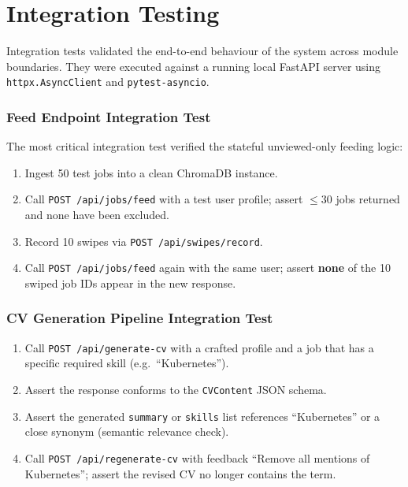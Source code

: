 \documentclass[12pt, a4paper, oneside]{report}
\begin{document}
\section{Integration Testing}
\label{sec:integration-testing}

Integration tests validated the end-to-end behaviour of the system across module
boundaries. They were executed against a running local FastAPI server using
\texttt{httpx.AsyncClient} and \texttt{pytest-asyncio}.

\subsubsection*{Feed Endpoint Integration Test}

The most critical integration test verified the stateful unviewed-only feeding logic:

\begin{enumerate}[itemsep=3pt]
  \item Ingest 50 test jobs into a clean ChromaDB instance.
  \item Call \texttt{POST /api/jobs/feed} with a test user profile; assert $\leq 30$ jobs
        returned and none have been excluded.
  \item Record 10 swipes via \texttt{POST /api/swipes/record}.
  \item Call \texttt{POST /api/jobs/feed} again with the same user; assert \textbf{none} of
        the 10 swiped job IDs appear in the new response.
\end{enumerate}

\subsubsection*{CV Generation Pipeline Integration Test}

\begin{enumerate}[itemsep=3pt]
  \item Call \texttt{POST /api/generate-cv} with a crafted profile and a job that has a
        specific required skill (e.g.\ ``Kubernetes'').
  \item Assert the response conforms to the \texttt{CVContent} JSON schema.
  \item Assert the generated \texttt{summary} or \texttt{skills} list references
        ``Kubernetes'' or a close synonym (semantic relevance check).
  \item Call \texttt{POST /api/regenerate-cv} with feedback ``Remove all mentions of
        Kubernetes''; assert the revised CV no longer contains the term.
\end{enumerate}
\end{document}
